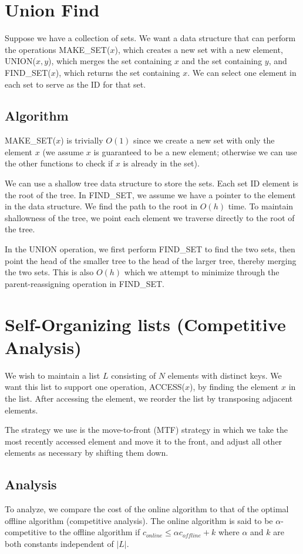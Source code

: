 \documentclass[10pt]{article}
\begin{document}
\section{Union Find}
Suppose we have a collection of sets. We want a data structure that can perform the operations MAKE\_SET($x$), which creates a new set with a new element, UNION($x, y$), which merges the set containing $x$ and the set containing $y$, and FIND\_SET($x$), which returns the set containing $x$. We can select one element in each set to serve as the ID for that set.
\subsection*{Algorithm}
MAKE\_SET($x$) is trivially $O(1)$ since we create a new set with only the element $x$ (we assume $x$ is guaranteed to be a new element; otherwise we can use the other functions to check if $x$ is already in the set).

We can use a shallow tree data structure to store the sets. Each set ID element is the root of the tree. In FIND\_SET, we assume we have a pointer to the element in the data structure. We find the path to the root in $O(h)$ time. To maintain shallowness of the tree, we point each element we traverse directly to the root of the tree.

In the UNION operation, we first perform FIND\_SET to find the two sets, then point the head of the smaller tree to the head of the larger tree, thereby merging the two sets. This is also $O(h)$ which we attempt to minimize through the parent-reassigning operation in FIND\_SET.

\section{Self-Organizing lists (Competitive Analysis)}
We wish to maintain a list $L$ consisting of $N$ elements with distinct keys. We want this list to support one operation, ACCESS($x$), by finding the element $x$ in the list. After accessing the element, we reorder the list by transposing adjacent elements.

The strategy we use is the move-to-front (MTF) strategy in which we take the most recently accessed element and move it to the front, and adjust all other elements as necessary by shifting them down.
\subsection*{Analysis}
To analyze, we compare the cost of the online algorithm to that of the optimal offline algorithm (competitive analysis). The online algorithm is said to be $\alpha$-competitive to the offline algorithm if $c_{online} \leq \alpha c_{offline} + k$ where $\alpha$ and $k$ are both constants independent of $|L|$.
\end{document}
